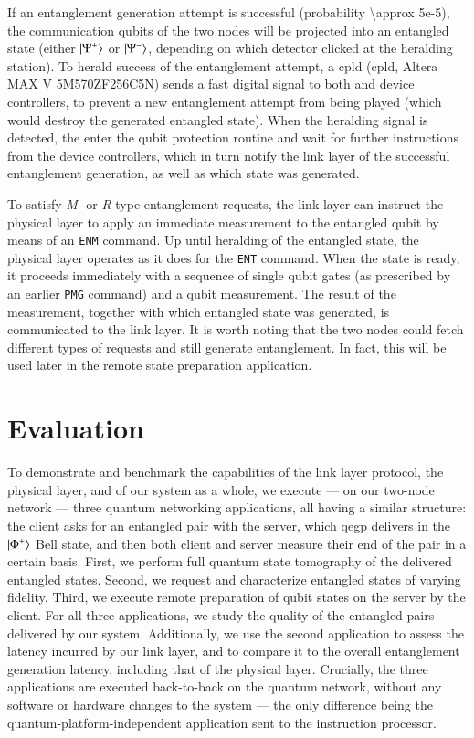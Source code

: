 If an entanglement generation attempt is successful (probability \num{\approx 5e-5}), the
communication qubits of the two nodes will be projected into an entangled state (either
$\ket{\Psi^+}$ or $\ket{\Psi^-}$, depending on which detector clicked at the heralding station). To
herald success of the entanglement attempt, a \acrshort{cpld} (\acrlong{cpld}, Altera MAX V
5M570ZF256C5N) sends a fast digital signal to both  and device controllers, to
prevent a new entanglement attempt from being played (which would destroy the generated entangled
state). When the heralding signal is detected, the  enter the qubit protection
routine and wait for further instructions from the device controllers, which in turn notify the link
layer of the successful entanglement generation, as well as which state was generated.

To satisfy \emph{M}- or \emph{R}-type entanglement requests, the link layer can instruct the
physical layer to apply an immediate measurement to the entangled qubit by means of an \texttt{ENM}
command. Up until heralding of the entangled state, the physical layer operates as it does for the
\texttt{ENT} command. When the state is ready, it proceeds immediately with a sequence of single
qubit gates (as prescribed by an earlier \texttt{PMG} command) and a qubit measurement. The result
of the measurement, together with which entangled state was generated, is communicated to the link
layer. It is worth noting that the two nodes could fetch different types of requests and still
generate entanglement. In fact, this will be used later in the remote state preparation application.

\section{Evaluation}
\label{sec:netstack:eval}

To demonstrate and benchmark the capabilities of the link layer protocol, the physical layer, and of
our system as a whole, we execute --- on our two-node network --- three quantum networking
applications, all having a similar structure: the client asks for an entangled pair with the server,
which \acrshort{qegp} delivers in the $\ket{\Phi^+}$ Bell state, and then both client and server
measure their end of the pair in a certain basis. First, we perform full quantum state tomography of
the delivered entangled states. Second, we request and characterize entangled states of varying
fidelity. Third, we execute remote preparation of qubit states on the server by the client. For all
three applications, we study the quality of the entangled pairs delivered by our system.
Additionally, we use the second application to assess the latency incurred by our link layer, and to
compare it to the overall entanglement generation latency, including that of the physical layer.
Crucially, the three applications are executed back-to-back on the quantum network, without any
software or hardware changes to the system --- the only difference being the
quantum-platform-independent application sent to the instruction processor.

